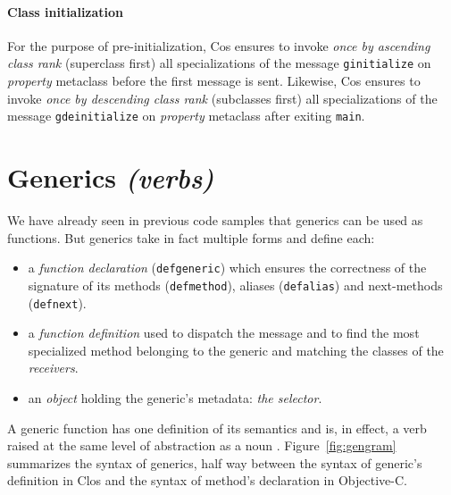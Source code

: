 \documentclass[preprint,10pt]{sigplanconf}
\newcommand{\ProgLang}[1]{{\sc #1}\xspace}
\newcommand{\Clos}      {\ProgLang{Clos}}
\newcommand{\Cos}       {\ProgLang{Cos}}
\newcommand{\Objc}      {\ProgLang{Objective-C}}
\newcommand{\code}[1]{\lstinline[language=COS,style=samplecode]|#1|}
\begin{document}
\paragraph{Class initialization\label{par:clsini}}

For the purpose of pre-initialization, \Cos ensures to invoke {\em once by ascending class rank} (superclass first) all specializations of the message \code{ginitialize} on {\em property} metaclass before the first message is sent. Likewise, \Cos ensures to invoke {\em once by descending class rank} (subclasses first) all specializations of the message \code{gdeinitialize} on {\em property} metaclass after exiting \code{main}.

\section{Generics {\em (verbs)}\label{sec:gen}}


We have already seen in previous code samples that generics can be used as functions. But generics take in fact multiple forms and define each:

\begin{itemize}
\item a {\em function declaration} (\code{defgeneric}) which ensures the correctness of the signature of its methods (\code{defmethod}), aliases (\code{defalias}) and next-methods (\code{defnext}).

\item a {\em function definition} used to dispatch the message and to find the most specialized method belonging to the generic and matching the classes of the {\em receivers}.

\item an {\em object} holding the generic's metadata: {\em the selector}.
\end{itemize}
A generic function has one definition of its semantics and is, in effect, a verb raised at the same level of abstraction as a noun \cite{fod91}. Figure~\ref{fig:gengram} summarizes the syntax of generics, half way between the syntax of generic's definition in \Clos and the syntax of method's declaration in \Objc.
\end{document}
